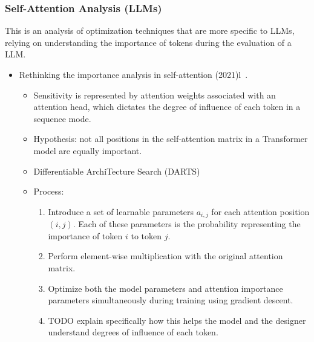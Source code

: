 
\subsubsection{Self-Attention Analysis (LLMs)}\label{subsubsec:token-importance-analysis}

This is an analysis of optimization techniques that are more specific to LLMs, relying on understanding the importance of tokens during the evaluation of a LLM\@.

\begin{itemize}
    \item Rethinking the importance analysis in self-attention (2021)l~\cite{shi2021sparsebert}.
    \begin{itemize}
        \item Sensitivity is represented by attention weights associated with an attention head, which dictates the degree of influence of each token in a sequence mode.
        \item Hypothesis: not all positions in the self-attention matrix in a Transformer model are equally important.
        \item Differentiable ArchiTecture Search (DARTS)
        \item Process:
        \begin{enumerate}
            \item Introduce a set of learnable parameters $a_{i,j}$ for each attention position $(i, j)$.
            Each of these parameters is the probability representing the importance of token $i$ to token $j$.
            \item Perform element-wise multiplication with the original attention matrix.
            \item Optimize both the model parameters and attention importance parameters simultaneously during training using gradient descent.
            \item TODO explain specifically how this helps the model and the designer understand degrees of influence of each token.
        \end{enumerate}
    \end{itemize}
\end{itemize}
